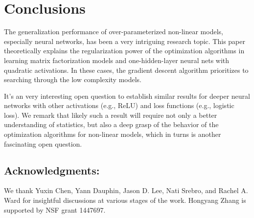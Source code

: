 \section{Conclusions}

The generalization performance of over-parameterized non-linear models, especially neural networks, has been a very intriguing research topic. This paper theoretically explains the regularization power of the optimization algorithms in learning matrix factorization models and one-hidden-layer neural nets with quadratic activations. In these cases, the gradient descent algorithm prioritizes to searching through the low complexity models. 

It's an very interesting open question to establish similar results for deeper neural networks with other activations (e.g., ReLU) and loss functions (e.g., logistic loss). We remark that likely such a result will require not only a better understanding of statistics, but also a deep grasp of the behavior of the optimization algorithms for non-linear models, which in turns is another fascinating open question.  

\subsection* {Acknowledgments: }

We thank Yuxin Chen, Yann Dauphin, Jason D. Lee, Nati Srebro, and Rachel A. Ward for insightful discussions at various stages of the work. 
Hongyang Zhang is supported by NSF grant 1447697.
